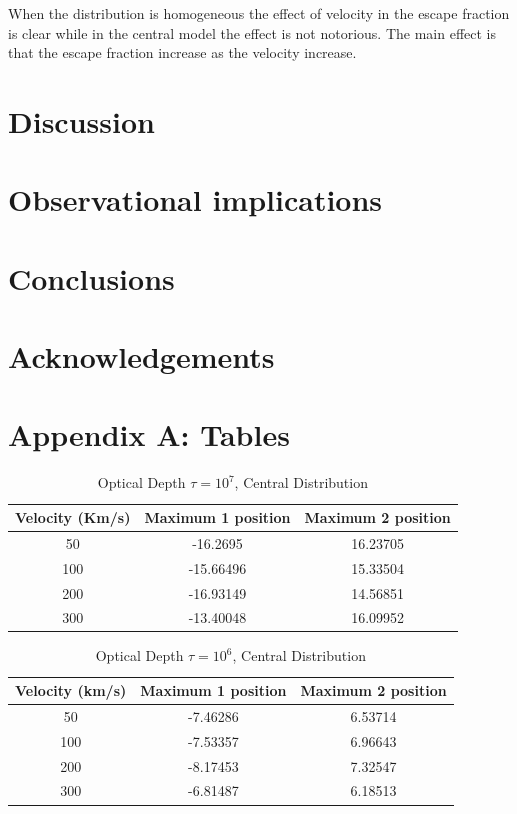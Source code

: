 \documentclass[usenatbib]{mn2e}
\begin{document}
When the distribution is homogeneous the effect of velocity in the
escape fraction is clear while in the central model the effect is not
notorious. 
The main effect is that the escape fraction increase as the velocity
increase.  


\section{Discussion}
\label{sec:discussion}

\section{Observational implications}

\section{Conclusions}

\section*{Acknowledgements}

\section*{Appendix A: Tables}

\begin{table}
\begin{center}
\begin{tabular}{ccc}\hline          
Velocity (Km/s) & Maximum 1 position & Maximum 2 position \\ \hline
50 & -16.2695 & 16.23705 \\ 
100 & -15.66496 & 15.33504 \\ 
200 & -16.93149 & 14.56851 \\ 
300 & -13.40048 & 16.09952 \\ \hline 
\end{tabular} 
\caption{Optical Depth $\tau= 10^{7}$, Central Distribution}
\end{center}
\end{table}

\begin{table}
\begin{center}
\begin{tabular}{ccc}\hline 
Velocity (km/s) & Maximum 1 position & Maximum 2 position\\ \hline
50 & -7.46286 & 6.53714 \\ 
100 & -7.53357 & 6.96643 \\ 
200 & -8.17453 & 7.32547 \\ 
300 & -6.81487 & 6.18513 \\ \hline 
\end{tabular} 
\end{center}
\caption{Optical Depth $\tau = 10^{6}$, Central Distribution}
\end{table}
\end{document}
